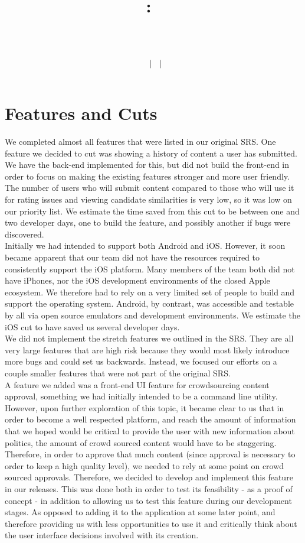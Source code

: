 \documentclass[11pt]{article}
\title{
    \vspace{2in}
    \textmd{\textbf{\hmwkClass:\ \hmwkTitle}}\\
    \vspace{0.1in}\large{\textit{\hmwkClassInstructor\ \hmwkClassTime}}\\
    \author{\textbf{\hmwkAuthorName\ $\vert$ \hmwkAuthorCSE\ $\vert$ \hmwkAuthorId}}
}
\date{}
\begin{document}
\section{Features and Cuts}

We completed almost all features that were listed in our original SRS. One feature we decided to cut was showing a history of content a user has submitted. We have the back-end implemented for this, but did not build the front-end in order to focus on making the existing features stronger and more user friendly. The number of users who will submit content compared to those who will use it for rating issues and viewing candidate similarities is very low, so it was low on our priority list. We estimate the time saved from this cut to be between one and two developer days, one to build the feature, and possibly another if bugs were discovered.\\

Initially we had intended to support both Android and iOS. However, it soon became apparent that our team did not have the resources required to consistently support the iOS platform. Many members of the team both did not have iPhones, nor the iOS development environments of the closed Apple ecosystem. We therefore had to rely on a very limited set of people to build and support the operating system. Android, by contrast, was accessible and testable by all via open source emulators and development environments. We estimate the iOS cut to have saved us several developer days.\\

We did not implement the stretch features we outlined in the SRS. They are all very large features that are high risk because they would most likely introduce more bugs and could set us backwards. Instead, we focused our efforts on a couple smaller features that were not part of the original SRS.\\

A feature we added was a front-end UI feature for crowdsourcing content approval, something we had initially intended to be a command line utility. However, upon further exploration of this topic, it became clear to us that in order to become a well respected platform, and reach the amount of information that we hoped would be critical to provide the user with new information about politics, the amount of crowd sourced content would have to be staggering. Therefore, in order to approve that much content (since approval is necessary to order to keep a high quality level), we needed to rely at some point on crowd sourced approvals. Therefore, we decided to develop and implement this feature in our releases. This was done both in order to test its feasibility - as a proof of concept - in addition to allowing us to test this feature during our development stages. As opposed to adding it to the application at some later point, and therefore providing us with less opportunities to use it and critically think about the user interface decisions involved with its creation.\\
\end{document}
